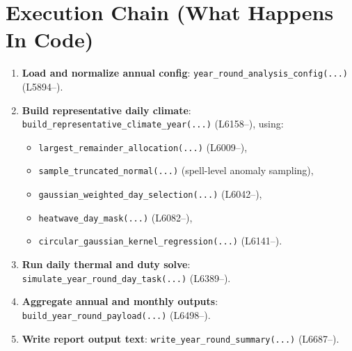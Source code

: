 \documentclass[11pt]{article}
\begin{document}
\section{Execution Chain (What Happens In Code)}
\begin{enumerate}[leftmargin=*]
\item \textbf{Load and normalize annual config}: \texttt{year\_round\_analysis\_config(...)} (L5894--).
\item \textbf{Build representative daily climate}: \texttt{build\_representative\_climate\_year(...)} (L6158--), using:
\begin{itemize}[leftmargin=*]
\item \texttt{largest\_remainder\_allocation(...)} (L6009--),
\item \texttt{sample\_truncated\_normal(...)} (spell-level anomaly sampling),
\item \texttt{gaussian\_weighted\_day\_selection(...)} (L6042--),
\item \texttt{heatwave\_day\_mask(...)} (L6082--),
\item \texttt{circular\_gaussian\_kernel\_regression(...)} (L6141--).
\end{itemize}
\item \textbf{Run daily thermal and duty solve}: \texttt{simulate\_year\_round\_day\_task(...)} (L6389--).
\item \textbf{Aggregate annual and monthly outputs}: \texttt{build\_year\_round\_payload(...)} (L6498--).
\item \textbf{Write report output text}: \texttt{write\_year\_round\_summary(...)} (L6687--).
\end{enumerate}
\end{document}
